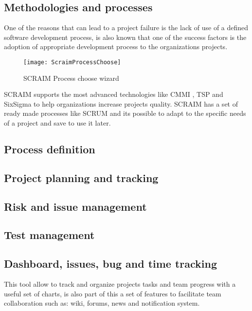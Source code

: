 \subsection{Methodologies and processes}
One of the reasons that can lead to a project failure is the lack of use of a defined software development process, is also known that one of the success factors is the adoption of appropriate development process to the organizations projects.

\begin{figure}[h]
	\begin{center}
		\leavevmode
		\texttt{[image: ScraimProcessChoose]}
		\caption{SCRAIM Process choose wizard}
		\label{fig:scraimrocesschoose}
	\end{center}
\end{figure}

SCRAIM supports the most advanced technologies like CMMI \citep{Development2010}, TSP and SixSigma \citep{SixSigmaWeb} to help organizations increase projects quality.
SCRAIM has a set of ready made processes like SCRUM \citep{Pries2011} and its possible to adapt to the specific needs of a project and save to use it later.

\subsection{Process definition}
\subsection{Project planning and tracking}
\subsection{Risk and issue management}
\subsection{Test management}



\subsection{Dashboard, issues, bug and time tracking}
This tool allow to track and organize projects tasks and team progress with a useful set of charts, is also part of this a set of features to facilitate team collaboration such as: wiki, forums, news and notification system.

